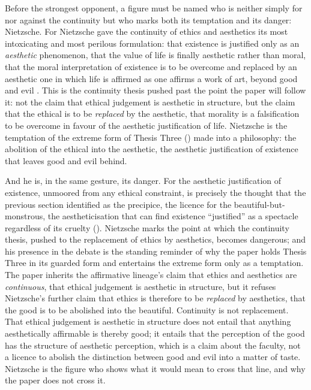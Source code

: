 Before the strongest opponent, a figure must be named who is neither simply for nor against the continuity but who marks both its temptation and its danger: Nietzsche. For Nietzsche gave the continuity of ethics and aesthetics its most intoxicating and most perilous formulation: that existence is justified only as an \emph{aesthetic} phenomenon, that the value of life is finally aesthetic rather than moral, that the moral interpretation of existence is to be overcome and replaced by an aesthetic one in which life is affirmed as one affirms a work of art, beyond good and evil \parencite{nietzsche1967}. This is the continuity thesis pushed past the point the paper will follow it: not the claim that ethical judgement is aesthetic in structure, but the claim that the ethical is to be \emph{replaced} by the aesthetic, that morality is a falsification to be overcome in favour of the aesthetic justification of life. Nietzsche is the temptation of the extreme form of Thesis Three () made into a philosophy: the abolition of the ethical into the aesthetic, the aesthetic justification of existence that leaves good and evil behind.

And he is, in the same gesture, its danger. For the aesthetic justification of existence, unmoored from any ethical constraint, is precisely the thought that the previous section identified as the precipice, the licence for the beautiful-but-monstrous, the aestheticisation that can find existence ``justified'' as a spectacle regardless of its cruelty (). Nietzsche marks the point at which the continuity thesis, pushed to the replacement of ethics by aesthetics, becomes dangerous; and his presence in the debate is the standing reminder of why the paper holds Thesis Three in its guarded form and entertains the extreme form only as a temptation. The paper inherits the affirmative lineage's claim that ethics and aesthetics are \emph{continuous}, that ethical judgement is aesthetic in structure, but it refuses Nietzsche's further claim that ethics is therefore to be \emph{replaced} by aesthetics, that the good is to be abolished into the beautiful. Continuity is not replacement. That ethical judgement is aesthetic in structure does not entail that anything aesthetically affirmable is thereby good; it entails that the perception of the good has the structure of aesthetic perception, which is a claim about the faculty, not a licence to abolish the distinction between good and evil into a matter of taste. Nietzsche is the figure who shows what it would mean to cross that line, and why the paper does not cross it.

